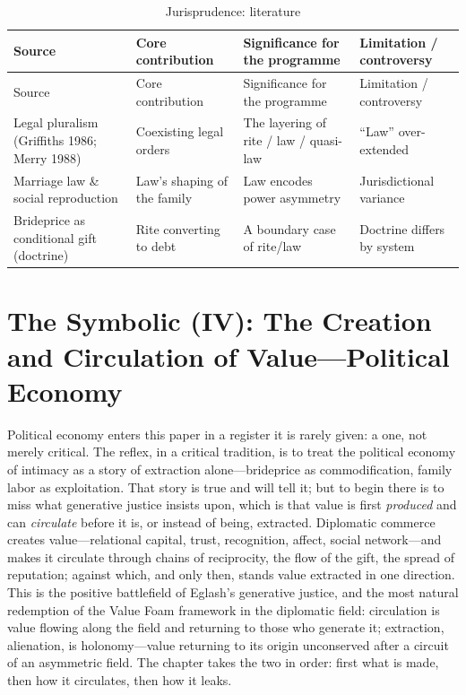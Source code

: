 \goldrule
\footnotesize
\begin{longtable}{Y Y Y Y}
\caption{Jurisprudence: literature}\label{p07:tab:juris}\\
\toprule
{}
Source & Core contribution & Significance for the programme & Limitation / controversy \\
\midrule
\endfirsthead
\toprule
{}
Source & Core contribution & Significance for the programme & Limitation / controversy \\
\midrule
\endhead
Legal pluralism (Griffiths 1986; Merry 1988) & Coexisting legal orders & The layering of rite / law / quasi-law & ``Law'' over-extended \\
Marriage law \& social reproduction & Law's shaping of the family & Law encodes power asymmetry & Jurisdictional variance \\
Brideprice as conditional gift (doctrine) & Rite converting to debt & A boundary case of rite/law & Doctrine differs by system \\
\bottomrule
\end{longtable}

\section{The Symbolic (IV): The Creation and Circulation of Value---Political Economy}\label{p07:sec:polecon}

Political economy enters this paper in a register it is rarely given: a  one, not merely critical. The reflex, in a critical tradition, is to treat the political economy of intimacy as a story of extraction alone---brideprice as commodification, family labor as exploitation. That story is true and  will tell it; but to begin there is to miss what generative justice insists upon, which is that value is first \emph{produced} and can \emph{circulate} before it is, or instead of being, extracted. Diplomatic commerce creates value---relational capital, trust, recognition, affect, social network---and makes it circulate through chains of reciprocity, the flow of the gift, the spread of reputation; against which, and only then, stands value extracted in one direction. This is the positive battlefield of Eglash's generative justice, and the most natural redemption of the Value Foam framework in the diplomatic field: circulation is value flowing along the field and returning to those who generate it; extraction, alienation, is holonomy---value returning to its origin unconserved after a circuit of an asymmetric field. The chapter takes the two in order: first what is made, then how it circulates, then how it leaks.

